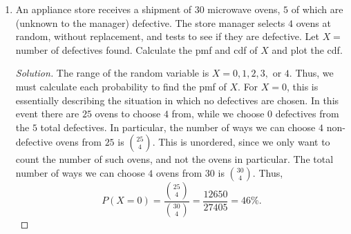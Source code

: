 \documentclass[12pt]{article}
\theoremstyle{definition}
\theoremstyle{plain}
\newenvironment{solution}
  {\begin{proof}[Solution]}
  {\end{proof}}
\begin{document}
\begin{enumerate}
\begin{solution}
\begin{enumerate}
	\item Since $ A $ and $ B $ are mutually exclusive (they are disjoint), we have $ A \cap B = \emptyset $. Then 
	\begin{align*}
		A \cap (A \cup B) &= (A \cap A) \cup (A \cap B)\\
		&= A \cup \emptyset = A.
	\end{align*}
	Using this to calculate the conditional probabilty, we have
	\begin{align*}
		P(A \mid A \cup B) &= \frac{P(A \cap (A \cup B))}{P(A \cup B)}\\
		&= \frac{ P(A) }{P(A \cup B)}\\
		&= \frac{P(A)}{P(A) + P(B) - P(A\cap B)}\\
		&= \frac{P(A)}{P(A) + P(B) - P(\empty)}\\
		&= \frac{P(A)}{P(A) + P(B)}.
	\end{align*}
	
	\item This follows easily from associativity of intersection and using $ P(A \mid B) = \frac{P(A \cap B)}{P(B)} \implies P(A \cap B) = P(A \mid B) P(B)$.
	\begin{align*}
		P(A \cap B \cap C) &= P(A \cap (B \cap C))\\
		&= P(A \mid B \cap C) P(B \cap C)\\
		&= P(A \mid B \cap C) [ P(B \mid C) P(C) ]\\
		&= P(A \mid B \cap C) P(B \mid C) P(C).
	\end{align*}
	\end{enumerate}

\end{solution}

\setcounter{enumi}{50}
\item An appliance store receives a shipment of $ 30 $ microwave ovens, $ 5 $ of which are (unknown to the manager) defective. The store manager selects $ 4 $ ovens at random, without replacement, and tests to see if they are defective. Let $ X = $ number of defectives found. Calculate the pmf and cdf of $ X $ and plot the cdf.

\begin{solution}
The range of the random variable is $ X = 0, 1, 2, 3, $ or $4 $. Thus, we must calculate each probability to find the pmf of $ X $.
For $ X = 0 $, this is essentially describing the situation in which no defectives are chosen. In this event there are $ 25 $ ovens to choose $ 4 $ from, while we choose $ 0 $ defectives from the $ 5 $ total defectives. In particular, the number of ways we can choose $ 4 $ non-defective ovens from $ 25 $ is $ \binom{25}{4} $. This is unordered, since we only want to count the number of such ovens, and not the ovens in particular. The total number of ways we can choose $ 4 $ ovens from $ 30 $ is $ \binom{30}{4} $. Thus,
\[ P(X = 0) = \frac{\binom{25}{4}}{ \binom{30}{4}} = \frac{12650}{27405} = 46 \%. \]


\end{solution}
\end{enumerate}
\end{document}
